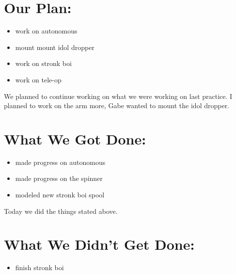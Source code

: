 \documentclass[12pt]{article}
\begin{document}
\section{Our Plan:} %
\begin{itemize}
	\item work on autonomous
\item mount mount idol dropper
\item work on stronk boi
\item work on tele-op
\end{itemize}

We planned to continue working on what we were working on last practice. I planned to work on the arm more, Gabe wanted to mount the idol dropper.
\section{What We Got Done:} %
\begin{itemize}
	\item made progress on autonomous
\item made progress on the spinner
\item modeled new stronk boi spool

\end{itemize}

Today we did the things stated above.

\section{What We Didn't Get Done:} %
\begin{itemize}
	\item finish stronk boi
\end{itemize}
\end{document}
